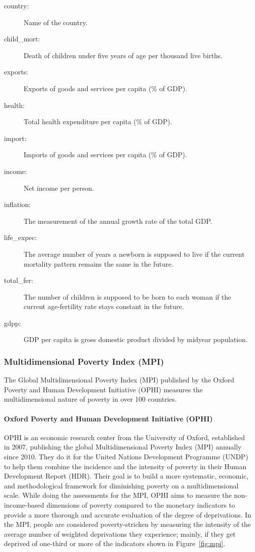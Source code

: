 \documentclass{swfuthesise}
\begin{document}
\begin{description}
\item[country:] Name of the country.
\item[child\_mort:] Death of children under five years of age per thousand live births.
\item[exports:] Exports of goods and services per capita (\% of GDP).
\item[health:] Total health expenditure per capita (\% of GDP).
\item[import:] Imports of goods and services per capita (\% of GDP).
\item[income:] Net income per person.
\item[inflation:] The measurement of the annual growth rate of the total GDP.
\item[life\_expec:] The average number of years a newborn is supposed to live if the current mortality pattern remains the same in the future.
\item[total\_fer:] The number of children is supposed to be born to each woman if the current age-fertility rate stays constant in the future.
\item[gdpp:] GDP per capita is gross domestic product divided by midyear population.
\end{description}

\subsubsection{Multidimensional Poverty Index (MPI)}

The Global Multidimensional Poverty Index (MPI) published by the Oxford Poverty and Human Development Initiative (OPHI) measures the multidimensional nature of poverty in over 100 countries.

\paragraph{Oxford Poverty and Human Development Initiative (OPHI)}

OPHI is an economic research center from the University of Oxford, established in 2007, publishing the global Multidimensional Poverty Index (MPI) annually since 2010. They do it for the United Nations Development Programme (UNDP) to help them combine the incidence and the intensity of poverty in their Human Development Report (HDR). Their goal is to build a more systematic, economic, and methodological framework for diminishing poverty on a multidimensional scale. While doing the assessments for the MPI, OPHI aims to measure the non-income-based dimensions of poverty compared to the monetary indicators to provide a more thorough and accurate evaluation of the degree of deprivations. In the MPI, people are considered poverty-stricken by measuring the intensity of the average number of weighted deprivations they experience; mainly, if they get deprived of one-third or more of the indicators shown in Figure~\ref{fig:mpi}.
\end{document}
